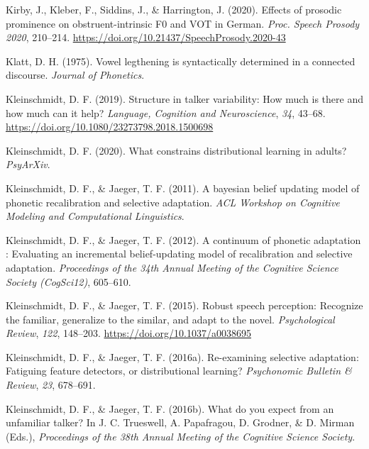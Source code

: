 \documentclass[
  11pt,
  man,floatsintext]{apa6}
\newlength{\cslhangindent}
\newlength{\cslentryspacingunit} %
\newenvironment{CSLReferences}[2] %
 {%
  \setlength{\parindent}{0pt}
  \ifodd #1
  \let\oldpar\par
  \def\par{\hangindent=\cslhangindent\oldpar}
  \fi
  \setlength{\parskip}{#2\cslentryspacingunit}
 }%
 {}
\begin{document}
\begin{CSLReferences}{1}{0}
\leavevmode{}%
Kirby, J., Kleber, F., Siddins, J., \& Harrington, J. (2020). {Effects of prosodic prominence on obstruent-intrinsic F0 and VOT in German}. \emph{Proc. Speech Prosody 2020}, 210--214. \url{https://doi.org/10.21437/SpeechProsody.2020-43}

\leavevmode{}%
Klatt, D. H. (1975). Vowel legthening is syntactically determined in a connected discourse. \emph{Journal of Phonetics}.

\leavevmode{}%
Kleinschmidt, D. F. (2019). Structure in talker variability: How much is there and how much can it help? \emph{Language, Cognition and Neuroscience}, \emph{34}, 43--68. \url{https://doi.org/10.1080/23273798.2018.1500698}

\leavevmode{}%
Kleinschmidt, D. F. (2020). What constrains distributional learning in adults? \emph{PsyArXiv}.

\leavevmode{}%
Kleinschmidt, D. F., \& Jaeger, T. F. (2011). A bayesian belief updating model of phonetic recalibration and selective adaptation. \emph{ACL Workshop on Cognitive Modeling and Computational Linguistics}.

\leavevmode{}%
Kleinschmidt, D. F., \& Jaeger, T. F. (2012). A continuum of phonetic adaptation : Evaluating an incremental belief-updating model of recalibration and selective adaptation. \emph{Proceedings of the 34th Annual Meeting of the Cognitive Science Society (CogSci12)}, 605--610.

\leavevmode{}%
Kleinschmidt, D. F., \& Jaeger, T. F. (2015). Robust speech perception: Recognize the familiar, generalize to the similar, and adapt to the novel. \emph{Psychological Review}, \emph{122}, 148--203. \url{https://doi.org/10.1037/a0038695}

\leavevmode{}%
Kleinschmidt, D. F., \& Jaeger, T. F. (2016a). Re-examining selective adaptation: Fatiguing feature detectors, or distributional learning? \emph{Psychonomic Bulletin \& Review}, \emph{23}, 678--691.

\leavevmode{}%
Kleinschmidt, D. F., \& Jaeger, T. F. (2016b). What do you expect from an unfamiliar talker? In J. C. Trueswell, A. Papafragou, D. Grodner, \& D. Mirman (Eds.), \emph{Proceedings of the 38th Annual Meeting of the Cognitive Science Society}.


\end{CSLReferences}
\end{document}
